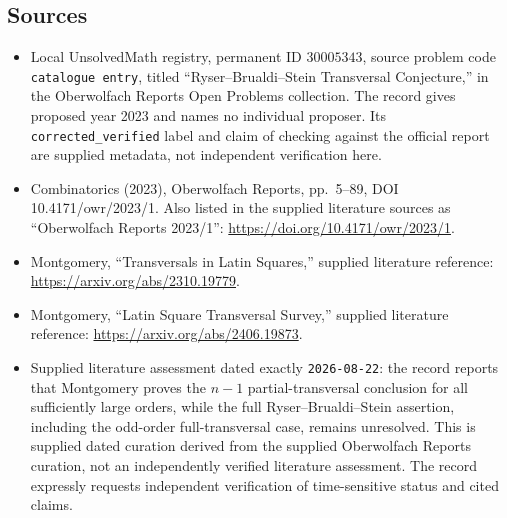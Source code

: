 \documentclass[11pt]{article}
\begin{document}
\subsection{Sources}
\begin{itemize}
\item Local UnsolvedMath registry, permanent ID \(30005343\), source problem code \texttt{catalogue entry}, titled ``Ryser--Brualdi--Stein Transversal Conjecture,'' in the Oberwolfach Reports Open Problems collection. The record gives proposed year 2023 and names no individual proposer. Its \texttt{corrected\_verified} label and claim of checking against the official report are supplied metadata, not independent verification here.
\item Combinatorics (2023), Oberwolfach Reports, pp.\ 5--89, DOI 10.4171/owr/2023/1. Also listed in the supplied literature sources as ``Oberwolfach Reports 2023/1'': \url{https://doi.org/10.4171/owr/2023/1}.
\item Montgomery, ``Transversals in Latin Squares,'' supplied literature reference: \url{https://arxiv.org/abs/2310.19779}.
\item Montgomery, ``Latin Square Transversal Survey,'' supplied literature reference: \url{https://arxiv.org/abs/2406.19873}.
\item Supplied literature assessment dated exactly \texttt{2026-08-22}: the record reports that Montgomery proves the \(n-1\) partial-transversal conclusion for all sufficiently large orders, while the full Ryser--Brualdi--Stein assertion, including the odd-order full-transversal case, remains unresolved. This is supplied dated curation derived from the supplied Oberwolfach Reports curation, not an independently verified literature assessment. The record expressly requests independent verification of time-sensitive status and cited claims.
\end{itemize}
\end{document}
